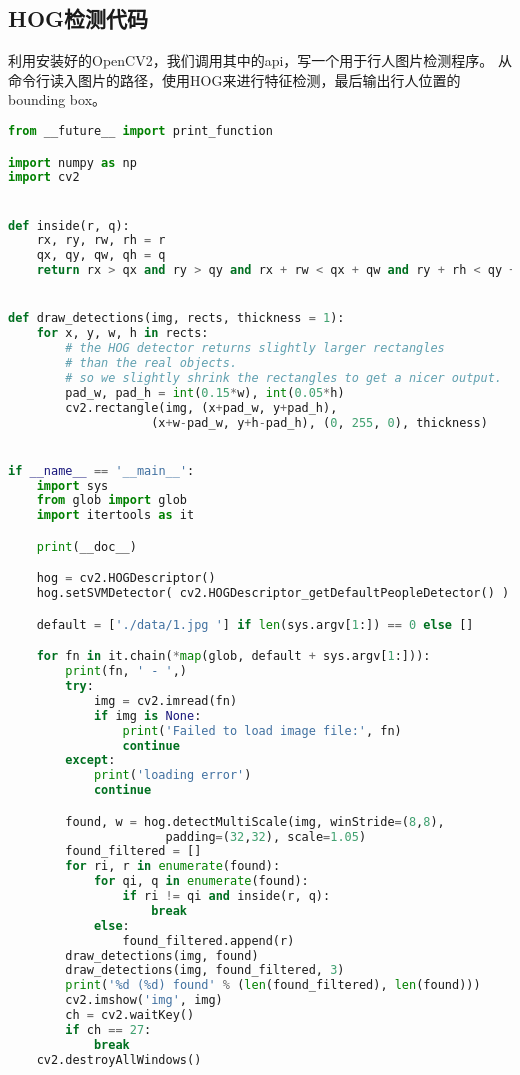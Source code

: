 \documentclass[openany]{ctexbook}
\begin{document}
\subsection{HOG检测代码}
利用安装好的OpenCV2，我们调用其中的api，写一个用于行人图片检测程序。
从命令行读入图片的路径，使用HOG来进行特征检测，最后输出行人位置的bounding box。
{\setmainfont{Courier New Bold}                          %
\begin{lstlisting}[language=python]
from __future__ import print_function

import numpy as np
import cv2


def inside(r, q):
    rx, ry, rw, rh = r
    qx, qy, qw, qh = q
    return rx > qx and ry > qy and rx + rw < qx + qw and ry + rh < qy + qh


def draw_detections(img, rects, thickness = 1):
    for x, y, w, h in rects:
        # the HOG detector returns slightly larger rectangles
        # than the real objects.
        # so we slightly shrink the rectangles to get a nicer output.
        pad_w, pad_h = int(0.15*w), int(0.05*h)
        cv2.rectangle(img, (x+pad_w, y+pad_h),
                    (x+w-pad_w, y+h-pad_h), (0, 255, 0), thickness)


if __name__ == '__main__':
    import sys
    from glob import glob
    import itertools as it

    print(__doc__)

    hog = cv2.HOGDescriptor()
    hog.setSVMDetector( cv2.HOGDescriptor_getDefaultPeopleDetector() )

    default = ['./data/1.jpg '] if len(sys.argv[1:]) == 0 else []

    for fn in it.chain(*map(glob, default + sys.argv[1:])):
        print(fn, ' - ',)
        try:
            img = cv2.imread(fn)
            if img is None:
                print('Failed to load image file:', fn)
                continue
        except:
            print('loading error')
            continue

        found, w = hog.detectMultiScale(img, winStride=(8,8),
                      padding=(32,32), scale=1.05)
        found_filtered = []
        for ri, r in enumerate(found):
            for qi, q in enumerate(found):
                if ri != qi and inside(r, q):
                    break
            else:
                found_filtered.append(r)
        draw_detections(img, found)
        draw_detections(img, found_filtered, 3)
        print('%d (%d) found' % (len(found_filtered), len(found)))
        cv2.imshow('img', img)
        ch = cv2.waitKey()
        if ch == 27:
            break
    cv2.destroyAllWindows()
\end{lstlisting}}
\end{document}
